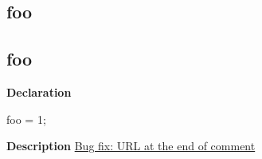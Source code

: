 \documentclass{report}
\newif\ifpdf
\begin{document}
\subsection*{\large{\textbf{foo}}\normalsize\hspace{1ex}\hrulefill}
\else
\subsection*{foo}
\fi
\label{ok_markdown-foo}
\begin{list}{}{
\setlength{\itemindent}{0cm}
\setlength{\listparindent}{0cm}
\setlength{\leftmargin}{\evensidemargin}
\addtolength{\leftmargin}{\tmplength}
\settowidth{\labelsep}{X}
\addtolength{\leftmargin}{\labelsep}
\setlength{\labelwidth}{\tmplength}
}
\item[\textbf{Declaration}\hfill]
\ifpdf
\begin{flushleft}
\fi
\begin{ttfamily}
foo = 1;\end{ttfamily}

\ifpdf
\end{flushleft}
\fi

\par
\item[\textbf{Description}]
\href{http://example}{Bug fix: URL at the end of comment}

\end{list}
\end{document}
